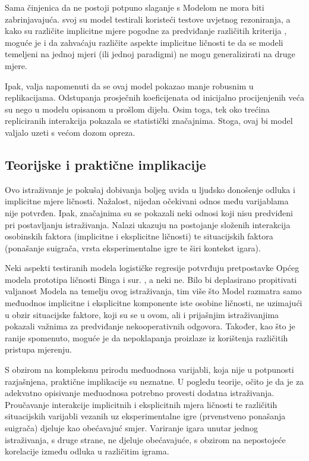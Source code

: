 \documentclass[a4paper, 12pt]{report}
\begin{document}
Sama činjenica da ne postoji potpuno slaganje s Modelom ne mora biti
zabrinjavajuća. \citet{bing2007integrating} svoj su model testirali koristeći
testove uvjetnog rezoniranja, a kako su različite implicitne mjere pogodne za
predviđanje različitih kriterija \citep{uhlmann2012getting}, moguće je i da
zahvaćaju različite aspekte implicitne ličnosti te da se modeli temeljeni na
jednoj mjeri (ili jednoj paradigmi) ne mogu generalizirati na druge mjere.

Ipak, valja napomenuti da se ovaj model pokazao manje robusnim u replikacijama.
Odstupanja prosječnih koeficijenata od inicijalno procijenjenih veća su nego u
modelu opisanom u prošlom dijelu. Osim toga, tek oko trećina repliciranih
interakcija pokazala se statistički značajnima. Stoga, ovaj bi model valjalo
uzeti s većom dozom opreza. 

\subsection{Teorijske i praktične implikacije}

Ovo istraživanje je pokušaj dobivanja boljeg uvida u ljudsko donošenje odluka
i implicitne mjere ličnosti. Nažalost, nijedan očekivani odnos među varijablama
nije potvrđen. Ipak, značajnima su se pokazali neki odnosi koji nisu predviđeni
pri postavljanju istraživanja. Nalazi ukazuju na postojanje složenih interakcija
osobinskih faktora (implicitne i eksplicitne ličnosti) te situacijskih faktora
(ponašanje suigrača, vrsta eksperimentalne igre te širi kontekst igara).

Neki aspekti testiranih modela logističke regresije potvrđuju pretpostavke
Općeg modela prototipa ličnosti Binga i sur. \citeyearpar{bing2007integrating},
a neki ne. Bilo bi deplasirano propitivati valjanost Modela na temelju ovog
istraživanja, tim više što Model razmatra samo međuodnos implicitne i
eksplicitne komponente iste osobine ličnosti, ne uzimajući u obzir situacijske
faktore, koji su se u ovom, ali i prijašnjim istraživanjima
pokazali važnima za predviđanje nekooperativnih odgovora. 
Također, kao što je ranije spomenuto, moguće je da nepoklapanja proizlaze iz
korištenja različitih pristupa mjerenju.

S obzirom na kompleksnu prirodu međuodnosa varijabli, koja nije u potpunosti
razjašnjena, praktične implikacije su neznatne. U pogledu teorije, očito je da
je za adekvatno opisivanje međuodnosa potrebno provesti dodatna istraživanja. 
Proučavanje interakcije implicitnih i eksplicitnih mjera ličnosti te različitih
situacijskih varijabli vezanih uz eksperimentalne igre (prvenstveno ponašanja
suigrača) djeluje kao obećavajuć smjer. Variranje igara unutar jednog
istraživanja, s druge strane, ne djeluje obećavajuće, s obzirom na nepostojeće
korelacije između odluka u različitim igrama.
\end{document}
